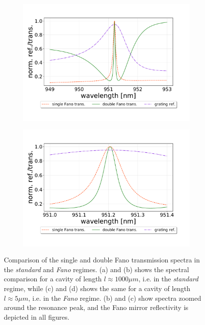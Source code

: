 \begin{figure}[h!]
\begin{subfigure}[c]{0.49\textwidth}
        \includegraphics[width=\textwidth]{figures/single_and_double_5um.pdf}
        \caption{}
        \label{fig:double_in_fano_regime}
    \end{subfigure}
    \begin{subfigure}[c]{0.49\textwidth}
        \includegraphics[width=\textwidth]{figures/single_and_double_5um_zoomed.pdf}
        \caption{}
        \label{fig:double_in_fano_regime_zoomed}
    \end{subfigure}
    \caption{Comparison of the single and double Fano transmission spectra in the \emph{standard} and \emph{Fano} regimes. (a) and (b) shows the spectral comparison for a cavity of length $l \approx 1000 \mu m$, i.e. in the \emph{standard} regime, while (c) and (d) shows the same for a cavity of length $l \approx 5 \mu m$, i.e. in the \emph{Fano} regime. (b) and (c) show spectra zoomed around the resonance peak, and the Fano mirror reflectivity is depicted in all figures.}
    \label{fig:double_in_standard_and_fano_regimes}
\end{figure}

